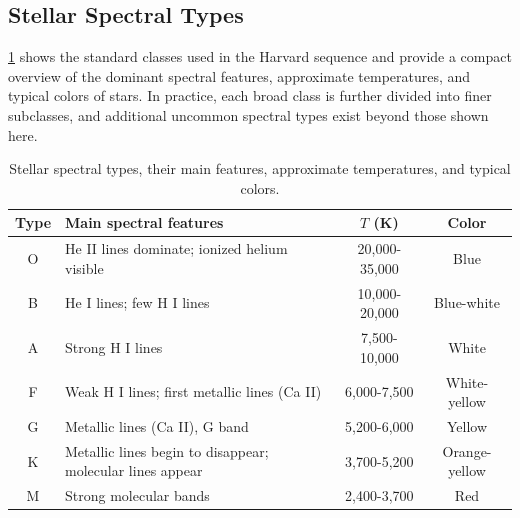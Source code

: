 \subsection{Stellar Spectral Types}

\cref{tab:stellar-spectral-types} shows the standard classes used in the Harvard sequence and provide a compact overview of the dominant spectral features, approximate temperatures, and typical colors of stars.
In practice, each broad class is further divided into finer subclasses, and additional uncommon spectral types exist beyond those shown here.
    
\vspace{-0.4em}

\begin{table}[h]
    \centering
    \small
    \begin{tabular}{@{}c l c c@{}}
        \toprule
        \textbf{Type} & \textbf{Main spectral features} & \textbf{$T$ (K)} & \textbf{Color} \\
        \midrule
        O & He II lines dominate; ionized helium visible & 20{,}000-35{,}000 & Blue \\
        B & He I lines; few H I lines & 10{,}000-20{,}000 & Blue-white \\
        A & Strong H I lines & 7{,}500-10{,}000 & White \\
        F & Weak H I lines; first metallic lines (Ca II) & 6{,}000-7{,}500 & White-yellow \\
        G & Metallic lines (Ca II), G band & 5{,}200-6{,}000 & Yellow \\
        K & Metallic lines begin to disappear; molecular lines appear & 3{,}700-5{,}200 & Orange-yellow \\
        M & Strong molecular bands & 2{,}400-3{,}700 & Red \\
        \bottomrule
    \end{tabular}
    \vspace{-0.2em}
    \caption{Stellar spectral types, their main features, approximate temperatures, and typical colors.}
    \label{tab:stellar-spectral-types}
\end{table}












